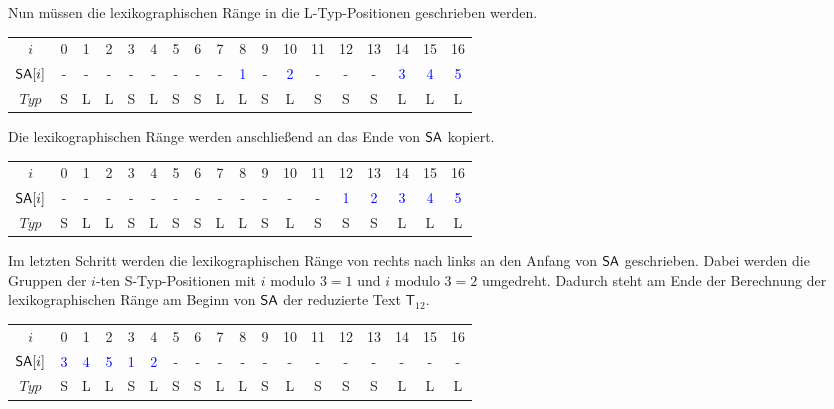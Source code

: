 Nun müssen die lexikographischen Ränge in die L-Typ-Positionen geschrieben werden.

\begin{table}[H]
	\footnotesize
	\centering
	\begin{tabular}{c| c c c c c c c c c c c c c c c c c}
		$i$ & 0 & 1 & 2 & 3 & 4 & 5 & 6 & 7 & 8 & 9 & 10 & 11 & 12 & 13 & 14 & 15 & 16 \\
		$\sa[i]$ & - & - & - & - & - & - & - & - & \textcolor{blue}{1} & - & \textcolor{blue}{2} & - & - & - & \textcolor{blue}{3} & \textcolor{blue}{4} & \textcolor{blue}{5} \\
		$Typ$ & S & L & L & S & L & S & S & L & L & S & L & S & S & S & L & L & L
	\end{tabular}
\end{table}

Die lexikographischen Ränge werden anschließend an das Ende von $\sa$ kopiert.

\begin{table}[H]
	\footnotesize
	\centering
	\begin{tabular}{c| c c c c c c c c c c c c c c c c c}
		$i$ & 0 & 1 & 2 & 3 & 4 & 5 & 6 & 7 & 8 & 9 & 10 & 11 & 12 & 13 & 14 & 15 & 16 \\
		$\sa[i]$ & - & - & - & - & - & - & - & - & - & - & - & - & \textcolor{blue}{1} & \textcolor{blue}{2} & \textcolor{blue}{3} & \textcolor{blue}{4} & \textcolor{blue}{5} \\
		$Typ$ & S & L & L & S & L & S & S & L & L & S & L & S & S & S & L & L & L
	\end{tabular}
\end{table}

Im letzten Schritt werden die lexikographischen Ränge von rechts nach links an den Anfang von $\sa$ geschrieben. Dabei werden die Gruppen der $i$-ten S-Typ-Positionen mit $i \text{ modulo } 3 = 1$ und $i \text{ modulo } 3 = 2$ umgedreht. Dadurch steht am Ende der Berechnung der lexikographischen Ränge am Beginn von $\sa$ der reduzierte Text $\mathsf{T}_{12}$.

\begin{table}[H]
	\footnotesize
	\centering
	\begin{tabular}{c| c c c c c c c c c c c c c c c c c}
		$i$ & 0 & 1 & 2 & 3 & 4 & 5 & 6 & 7 & 8 & 9 & 10 & 11 & 12 & 13 & 14 & 15 & 16 \\
		$\sa[i]$ & \textcolor{blue}{3} & \textcolor{blue}{4} & \textcolor{blue}{5} & \textcolor{blue}{1} & \textcolor{blue}{2} & - & - & - & - & - & - & - & - & - & - & - & - \\
		$Typ$ & S & L & L & S & L & S & S & L & L & S & L & S & S & S & L & L & L
	\end{tabular}
\end{table}

